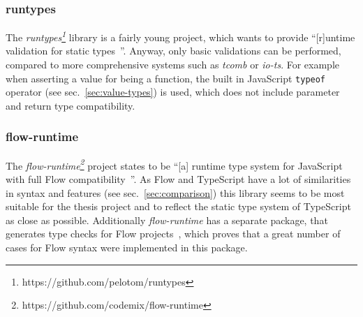 \subsubsection{runtypes}

The \emph{runtypes\footnote{https://github.com/pelotom/runtypes}} library is a fairly young project, which wants to provide ``[r]untime validation for static types~\cite{RuntimeTypeSystem:runtypes}''. Anyway, only basic validations can be performed, compared to more comprehensive systems such as \emph{tcomb} or \emph{io-ts}. For example when asserting a value for being a function, the built in JavaScript \texttt{typeof} operator (see sec.~\ref{sec:value-types}) is used, which does not include parameter and return type compatibility.

\subsubsection{flow-runtime}

The \emph{flow-runtime\footnote{https://github.com/codemix/flow-runtime}} project states to be ``[a] runtime type system for JavaScript with full Flow compatibility~\cite{RuntimeTypeSystem:flow-runtime:lib}''. As Flow and TypeScript have a lot of similarities in syntax and features (see sec.~\ref{sec:comparison}) this library seems to be most suitable for the thesis project and to reflect the static type system of TypeScript as close as possible. Additionally \emph{flow-runtime} has a separate package, that generates type checks for Flow projects~\cite{RuntimeTypeSystem:flow-runtime:babel}, which proves that a great number of cases for Flow syntax were implemented in this package.





